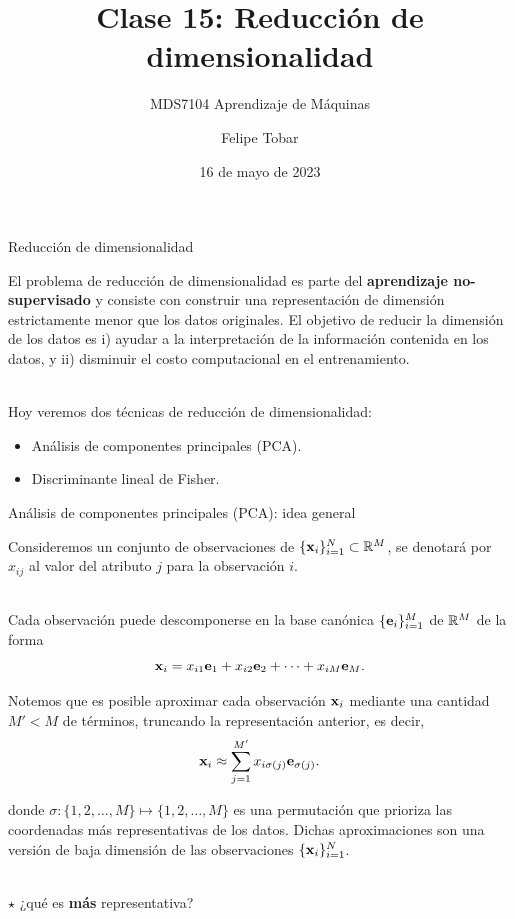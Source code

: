 \documentclass[9pt, handout]{beamer}
\title{Clase 15: Reducción de dimensionalidad}
\subtitle{MDS7104 Aprendizaje de Máquinas}
\date{16 de mayo de 2023}
\author{Felipe Tobar}
\institute{Iniciativa de Datos e Inteligencia Artificial\\Universidad de Chile}
\begin{document}
\begin{frame}
  \titlepage
\end{frame}

\begin{frame}{Reducción de dimensionalidad}

El problema de reducción de dimensionalidad es parte del \textbf{aprendizaje no-supervisado} y consiste con construir una representación de dimensión estrictamente menor que los datos originales. El objetivo de reducir la dimensión de los datos es i) ayudar a la interpretación de la información contenida en los datos, y ii) disminuir el costo computacional en el entrenamiento.\\~\ \pause

Hoy veremos dos técnicas de reducción de dimensionalidad:
  
\begin{itemize}
	\item Análisis de componentes principales (PCA).
	\item Discriminante lineal de Fisher.
\end{itemize}
	
\end{frame}

\begin{frame}{Análisis de componentes principales (PCA): idea general}

Consideremos un conjunto de observaciones de $\{\mathbf{x}_i\}_{i=1}^N\subset\mathbb{R}^M$, se denotará por $x_{ij}$ al valor del atributo $j$ para la observación $i$. \\~\ \pause

Cada observación puede descomponerse en la base canónica $\{\mathbf{e}_i\}_{i=1}^M$ de $\mathbb{R}^M$ de la forma 
\begin{equation*}
	\mathbf{x}_i = x_{i1}\mathbf{e}_1 +  x_{i2}\mathbf{e}_2 + \cdots + x_{iM}\mathbf{e}_M.	
\end{equation*}\pause

Notemos que es posible aproximar cada observación $\mathbf{x}_i$ mediante una cantidad $M'<M$ de términos, truncando la representación anterior, es decir,  
\begin{equation*}
	\mathbf{x}_i \approx \sum_{j=1}^{M'} x_{i\sigma(j)}\mathbf{e}_{\sigma(j)}.
\end{equation*}

donde $\sigma:\{1,2,\ldots,M\}\mapsto\{1,2,\ldots,M\}$ es una permutación que prioriza las coordenadas más representativas de los datos. Dichas aproximaciones son una versión de baja dimensión de las observaciones $\{\mathbf{x}_i\}_{i=1}^N$.\\~\ 

$\star$ ¿qué es \textbf{más} representativa?
\end{frame}
\end{document}
